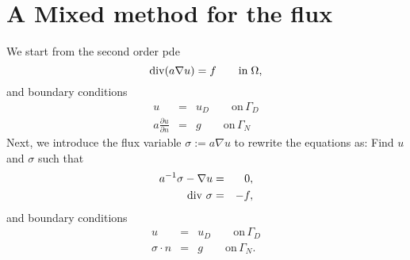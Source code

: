 \section{A Mixed method for the flux}

We start from the second order pde
$$
\operatorname{div} (a \nabla u) = f \qquad \mbox{in} \; \Omega,
$$
and boundary conditions
\begin{eqnarray*}
u & = & u_D \qquad \mbox{on} \, \Gamma_D \\
a \frac{\partial u}{\partial n} & = & g \qquad \mbox{on} \, \Gamma_N
\end{eqnarray*}
Next, we introduce the flux variable $\sigma := a \nabla u$
to rewrite the equations as: Find $u$ and $\sigma$ such that
\begin{eqnarray}
a^{-1} \sigma - \nabla u & = & 0,   \label{equ_mixedsigma}  \\
\operatorname{div} \, \sigma & = & -f,       \label{equ_mixedu}
\end{eqnarray}
and boundary conditions
\begin{eqnarray*}
u & = & u_D \qquad \mbox{on} \, \Gamma_D \\
\sigma \cdot n & = & g \qquad \mbox{on} \, \Gamma_N.
\end{eqnarray*}

